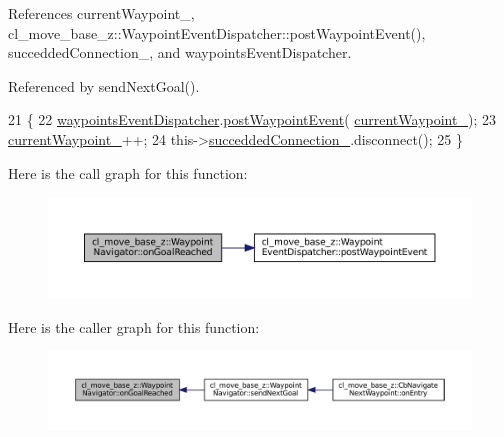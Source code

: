 References current\+Waypoint\+\_\+, cl\+\_\+move\+\_\+base\+\_\+z\+::\+Waypoint\+Event\+Dispatcher\+::post\+Waypoint\+Event(), succedded\+Connection\+\_\+, and waypoints\+Event\+Dispatcher.



Referenced by send\+Next\+Goal().


\begin{DoxyCode}
21 \{
22   \hyperlink{classcl__move__base__z_1_1WaypointNavigator_a4f2be7a9741e8535c414e63335d752a0}{waypointsEventDispatcher}.\hyperlink{classcl__move__base__z_1_1WaypointEventDispatcher_a6462eae610b97df2207ecd93c1544aaf}{postWaypointEvent}(
      \hyperlink{classcl__move__base__z_1_1WaypointNavigator_a82859e418592c2392c20a2d11b9836eb}{currentWaypoint\_});
23   \hyperlink{classcl__move__base__z_1_1WaypointNavigator_a82859e418592c2392c20a2d11b9836eb}{currentWaypoint\_}++;
24   this->\hyperlink{classcl__move__base__z_1_1WaypointNavigator_a6e32b1d6cae56963187d0965de251108}{succeddedConnection\_}.disconnect();
25 \}
\end{DoxyCode}
Here is the call graph for this function\+:
\nopagebreak
\begin{figure}[H]
\begin{center}
\leavevmode
\includegraphics[width=350pt]{classcl__move__base__z_1_1WaypointNavigator_ae10ba80b7e46b62096cac96609f66893_cgraph}
\end{center}
\end{figure}
Here is the caller graph for this function\+:
\nopagebreak
\begin{figure}[H]
\begin{center}
\leavevmode
\includegraphics[width=350pt]{classcl__move__base__z_1_1WaypointNavigator_ae10ba80b7e46b62096cac96609f66893_icgraph}
\end{center}
\end{figure}
\mbox{\label{classcl__move__base__z_1_1WaypointNavigator_a75f7b66878f380dd81516fbd7cb3640d}} 
